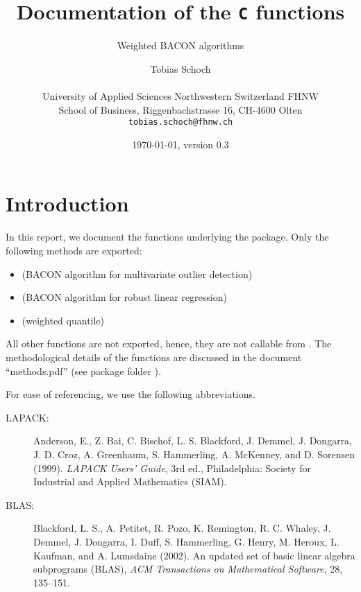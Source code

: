 \documentclass[a4paper,oneside,10pt,DIV=12]{scrreprt}
\begin{document}
 
\title{\Large Documentation of the \texttt{C} functions}
\subtitle{Weighted BACON algorithms} 

\author{{\normalsize Tobias Schoch} \\ 
\begin{minipage}[t][][t]{\textwidth}
	\begin{center}
	\small{University of Applied Sciences Northwestern Switzerland FHNW} \\
	\small{School of Business, Riggenbachstrasse 16, CH-4600 Olten} \\
	\small{\texttt{tobias.schoch{@}fhnw.ch}}
	\end{center}
\end{minipage}} 

\date{{\small \today, version 0.3}}
\maketitle

\tableofcontents

\chapter{Introduction}
In this report, we document the  functions underlying the 
 package. Only the following methods are exported:
\begin{itemize}
	\item {} (BACON algorithm for multivariate 
		outlier detection)
	\item {} (BACON algorithm for robust
		linear regression)
	\item {} (weighted quantile) 
\end{itemize}

\noindent All other functions are not exported, hence, they are not callable
from . The methodological details of the functions are discussed in the
document ``methods.pdf'' (see package folder ).

For ease of referencing, we use the following abbreviations. 
\begin{description}
	\item[\small{LAPACK}:] Anderson, E., Z. Bai, C. Bischof, L. S. Blackford,
J. Demmel, J. Dongarra, J. D. Croz, A. Greenhaum, S. Hammerling, A. McKenney,
and D. Sorensen (1999). \textit{LAPACK Users’ Guide}, 3rd ed., Philadelphia:
Society for Industrial and Applied Mathematics (SIAM).
	\item[\small{BLAS}:] Blackford, L. S., A. Petitet, R. Pozo, K. Remington,
R. C. Whaley, J. Demmel, J. Dongarra, I. Duff, S. Hammerling, G. Henry, 
M. Heroux, L. Kaufman, and A. Lumsdaine (2002). An updated set of basic linear
algebra subprograms (BLAS), \textit{ACM Transactions on Mathematical Software},
28, 135--151.
\end{description}
\end{document}

